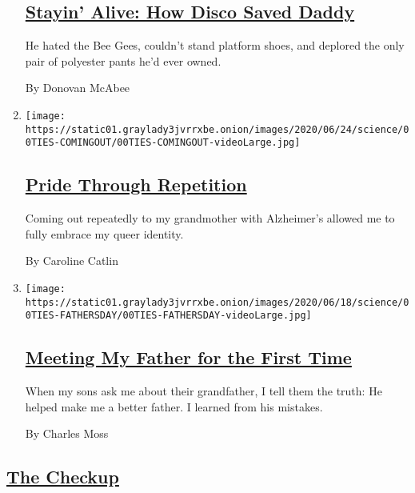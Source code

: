 \begin{enumerate}
{  \subsection{\texorpdfstring{\href{/2020/07/10/well/family/heart-attack-disco-music-CPR.html}{Stayin'
  Alive: How Disco Saved
  Daddy}}{Stayin' Alive: How Disco Saved Daddy}}\label{stayin-alive-how-disco-saved-daddy}}

  He hated the Bee Gees, couldn't stand platform shoes, and deplored the
  only pair of polyester pants he'd ever owned.

  By Donovan McAbee
\item
  \texttt{[image: https://static01.graylady3jvrrxbe.onion/images/2020/06/24/science/00TIES-COMINGOUT/00TIES-COMINGOUT-videoLarge.jpg]}

  \hypertarget{pride-through-repetition}{%
  \subsection{\texorpdfstring{\href{/2020/06/26/well/family/LGBT-pride-dementia.html}{Pride
  Through
  Repetition}}{Pride Through Repetition}}\label{pride-through-repetition}}

  Coming out repeatedly to my grandmother with Alzheimer's allowed me to
  fully embrace my queer identity.

  By Caroline Catlin
\item
  \texttt{[image: https://static01.graylady3jvrrxbe.onion/images/2020/06/18/science/00TIES-FATHERSDAY/00TIES-FATHERSDAY-videoLarge.jpg]}

  \hypertarget{meeting-my-father-for-the-first-time}{%
  \subsection{\texorpdfstring{\href{/2020/06/19/well/family/fathers-day-parents.html}{Meeting
  My Father for the First
  Time}}{Meeting My Father for the First Time}}\label{meeting-my-father-for-the-first-time}}

  When my sons ask me about their grandfather, I tell them the truth: He
  helped make me a better father. I learned from his mistakes.

  By Charles Moss
\end{enumerate}

\hypertarget{the-checkup-1}{%
\subsection{\texorpdfstring{\href{/column/the-checkup}{The
Checkup}}{The Checkup}}\label{the-checkup-1}}

